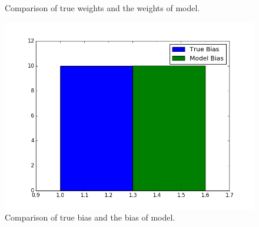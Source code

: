 \documentclass[letter, 12pt]{article}
\begin{document}
\begin{enumerate}
\begin{figure}[H]
\begin{minipage}{.48\textwidth}
    			\caption{Comparison of true weights and the weights of model.}
    			\label{fig:q4-2}
    		\end{minipage}
    		\begin{minipage}{.48\textwidth}
    			\centering
    			\includegraphics[width=\linewidth]{q4-3.png}
    			\caption{Comparison of true bias and the bias of model.}
    			\label{fig:q4-3}
    		\end{minipage}
    	\end{figure}
    

\end{enumerate}
\end{document}
